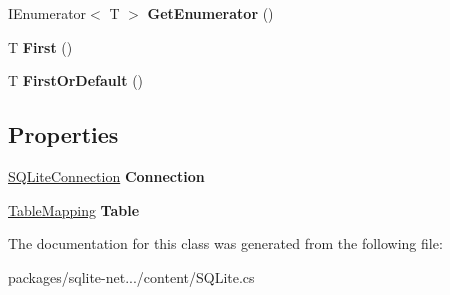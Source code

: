 \begin{DoxyCompactItemize}
\item 
\hypertarget{classSQLite_1_1TableQuery_a3929d540dd0a888291077626d4690202}{}I\+Enumerator$<$ T $>$ {\bfseries Get\+Enumerator} ()\label{classSQLite_1_1TableQuery_a3929d540dd0a888291077626d4690202}

\item 
\hypertarget{classSQLite_1_1TableQuery_a5d9bc1e1c29e1da74671e17033f2badb}{}T {\bfseries First} ()\label{classSQLite_1_1TableQuery_a5d9bc1e1c29e1da74671e17033f2badb}

\item 
\hypertarget{classSQLite_1_1TableQuery_a517c2275d7bd055d07f0b810cb8ae179}{}T {\bfseries First\+Or\+Default} ()\label{classSQLite_1_1TableQuery_a517c2275d7bd055d07f0b810cb8ae179}

\end{DoxyCompactItemize}
\subsection*{Properties}
\begin{DoxyCompactItemize}
\item 
\hypertarget{classSQLite_1_1TableQuery_a1bd298971d8227cb1b0b57c2260a681a}{}\hyperlink{classSQLite_1_1SQLiteConnection}{S\+Q\+Lite\+Connection} {\bfseries Connection}\label{classSQLite_1_1TableQuery_a1bd298971d8227cb1b0b57c2260a681a}

\item 
\hypertarget{classSQLite_1_1TableQuery_a9ec80a11185abc4cc6766789d1723b4c}{}\hyperlink{classSQLite_1_1TableMapping}{Table\+Mapping} {\bfseries Table}\label{classSQLite_1_1TableQuery_a9ec80a11185abc4cc6766789d1723b4c}

\end{DoxyCompactItemize}


The documentation for this class was generated from the following file\+:\begin{DoxyCompactItemize}
\item 
packages/sqlite-\/net.../content/S\+Q\+Lite.\+cs\end{DoxyCompactItemize}
